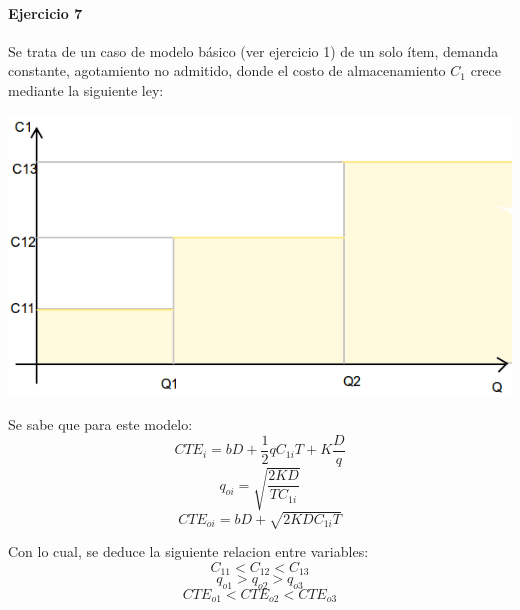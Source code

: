 \documentclass{article}
\begin{document}
\pagebreak

\paragraph{Ejercicio 7}
Se trata de un caso de modelo básico (ver ejercicio 1) de un solo ítem, demanda constante, agotamiento no admitido, donde el costo de almacenamiento $C_{1}$ crece mediante la siguiente ley:
\begin{center}
  \includegraphics[scale=0.4,keepaspectratio=true]{img/7/7_QvsC1.png} 
\end{center}
Se sabe que para este modelo:
  \begin{equation}\label{7_CTE}CTE_i = bD + \frac{1}{2}qC_{1i}T + K\frac{D}{q} \end{equation}
  $$ q_{oi} = \sqrt{ \frac{2KD}{TC_{1i}}} $$
  $$ CTE_{oi} = bD + \sqrt{ 2KDC_{1i}T }$$

Con lo cual, se deduce la siguiente relacion entre variables:
 $$ C_{11} < C_{12} < C_{13} $$
 $$ q_{o1} > q_{o2} > q_{o3}$$
 $$ CTE_{o1} < CTE_{o2} < CTE_{o3} $$
 
\end{document}
